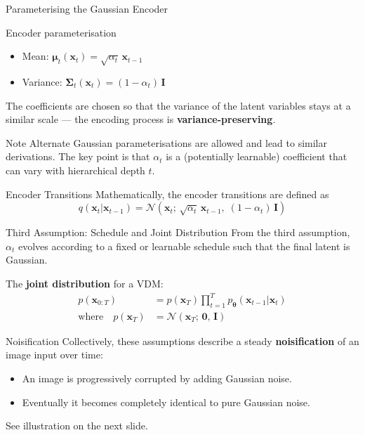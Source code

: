 \documentclass[aspectratio=169,10pt]{beamer}
\newcommand{\bx}{\bm{x}}
\newcommand{\btheta}{\bm{\theta}}
\newcommand{\bmu}{\bm{\mu}}
\newcommand{\bSigma}{\bm{\Sigma}}
\begin{document}
\begin{frame}{Parameterising the Gaussian Encoder}
  \begin{block}{Encoder parameterisation}
    \begin{itemize}
      \item Mean: $\bmu_t(\bx_t) = \sqrt{\alpha_t}\,\bx_{t-1}$
      \item Variance: $\bSigma_t(\bx_t) = (1-\alpha_t)\,\mathbf{I}$
    \end{itemize}
    The coefficients are chosen so that the variance of the latent variables
    stays at a similar scale — the encoding process is \textbf{variance-preserving}.
  \end{block}
  \begin{block}{Note}
    Alternate Gaussian parameterisations are allowed and lead to similar
    derivations. The key point is that $\alpha_t$ is a (potentially learnable)
    coefficient that can vary with hierarchical depth $t$.
  \end{block}
\end{frame}

\begin{frame}{Encoder Transitions}
  Mathematically, the encoder transitions are defined as
  \[
    q(\bx_t|\bx_{t-1})
    = \mathcal{N}\!\left(\bx_t;\,\sqrt{\alpha_t}\,\bx_{t-1},\;
      (1-\alpha_t)\,\mathbf{I}\right)
  \]
\end{frame}

\begin{frame}{Third Assumption: Schedule and Joint Distribution}
  From the third assumption, $\alpha_t$ evolves according to a fixed or
  learnable schedule such that the final latent is Gaussian.

  The \textbf{joint distribution} for a VDM:
  \begin{align*}
    p(\bx_{0:T})
    &= p(\bx_T)\prod_{t=1}^{T} p_{\btheta}(\bx_{t-1}|\bx_t) \\
    \text{where} \quad
    p(\bx_T) &= \mathcal{N}(\bx_T;\,\bm{0},\,\mathbf{I})
  \end{align*}
\end{frame}

\begin{frame}{Noisification}
  Collectively, these assumptions describe a steady
  \textbf{noisification} of an image input over time:
  \begin{itemize}
    \item An image is progressively corrupted by adding Gaussian noise.
    \item Eventually it becomes completely identical to pure Gaussian noise.
  \end{itemize}
  \vspace{4pt}
  See illustration on the next slide.
\end{frame}
\end{document}

